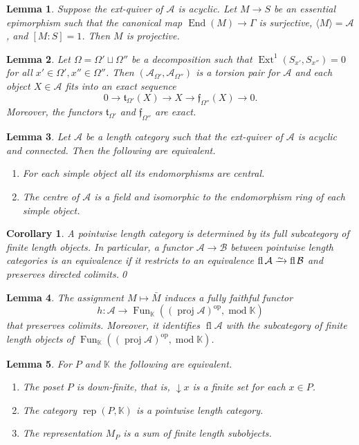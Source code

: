 \documentclass[10pt,a4paper]{amsart}
\newtheorem{lem}{Lemma}
\newtheorem{cor}{Corollary}
\def\A{\mathcal A}
\def\B{\mathcal B}
\newcommand{\End}{\operatorname{End}}
\newcommand{\Ext}{\operatorname{Ext}}
\newcommand{\Fun}{\operatorname{Fun}}
\def\Ga{\Gamma}
\def\bbK{\mathbb K}
\newcommand{\fl}{\operatorname{fl}}
\newcommand{\frf}{\mathfrak{f}}
\newcommand{\frt}{\mathfrak{t}}
\newcommand{\iso}{\xrightarrow{\raisebox{-.4ex}[0ex][0ex]{$\scriptstyle{\sim}$}}}
\newcommand{\lto}{\longrightarrow}
\renewcommand{\mod}{\operatorname{mod}}
\newcommand{\op}{\mathrm{op}}
\newcommand{\proj}{\operatorname{proj}}
\newcommand{\rep}{\operatorname{rep}}
\begin{document}
\begin{lem}\label{le:max}
  Suppose the ext-quiver of $\A$ is acyclic. Let $M\to S$ be an essential
  epimorphism such that the canonical map $\End(M)\to\Ga$ is surjective,
 $\langle M\rangle=\A$, and $[M:S]=1$. Then $M$ is projective.
\end{lem}

\begin{lem}\label{le:torsion}
  Let $\Omega=\Omega'\sqcup \Omega''$ be a decomposition such that
  $\Ext^1(S_{x'}, S_{x''})=0$ for all $x'\in \Omega',x''\in
  \Omega''$. Then $(\A_{\Omega'},\A_{\Omega''})$ is a torsion pair for
  $\A$ and each object $X\in\A$ fits into an exact sequence
  \begin{equation*}\label{eq:tor}
    0\lto \frt_{\Omega'}(X)\lto X\lto \frf_{\Omega''}(X)\lto 0.
\end{equation*}    
Moreover, the functors $\frt_{\Omega'}$ and  $\frf_{\Omega''}$ are exact.
\end{lem}

\begin{lem}\label{le:centre}
  Let $\A$ be a length category such that the ext-quiver of $\A$ is
  acyclic and connected. Then the following are equivalent.
  \begin{enumerate}
  \item For each simple object all its endomorphisms are central.
  \item The centre of $\A$ is a field and isomorphic to the
    endomorphism ring of each simple object.
  \end{enumerate}
\end{lem}

\begin{cor}\label{co:ptfl}
A pointwise length category is determined by its
full subcategory of finite length objects. In particular, a functor
$\A\to\B$ between  pointwise length categories is an equivalence if it restricts
to an equivalence $\fl\A\iso\fl\B$ and preserves directed colimits.\qed
\end{cor}

\begin{lem}\label{le:ptfl}
  The assignment $M\mapsto\bar M$ induces a 
  fully faithful functor
  \[h\colon\A\lto\Fun_\bbK((\proj\A)^\op,\mod\bbK)\] that preserves
  colimits. Moreover, it identifies $\fl\A$ with the subcategory of
  finite length objects of $\Fun_\bbK((\proj\A)^\op,\mod\bbK)$.
\end{lem}

\begin{lem}\label{le:downfinite}
For $P$  and $\bbK$ the following are equivalent.
\begin{enumerate}
\item The poset $P$ is down-finite, that is,
  $\downarrow\! x$ is a finite set for each $x\in P$.
\item The category $\rep(P,\bbK)$ is a pointwise length category.
\item The representation $M_P$  is a sum of finite length subobjects. 
\end{enumerate}
\end{lem}
\end{document}
